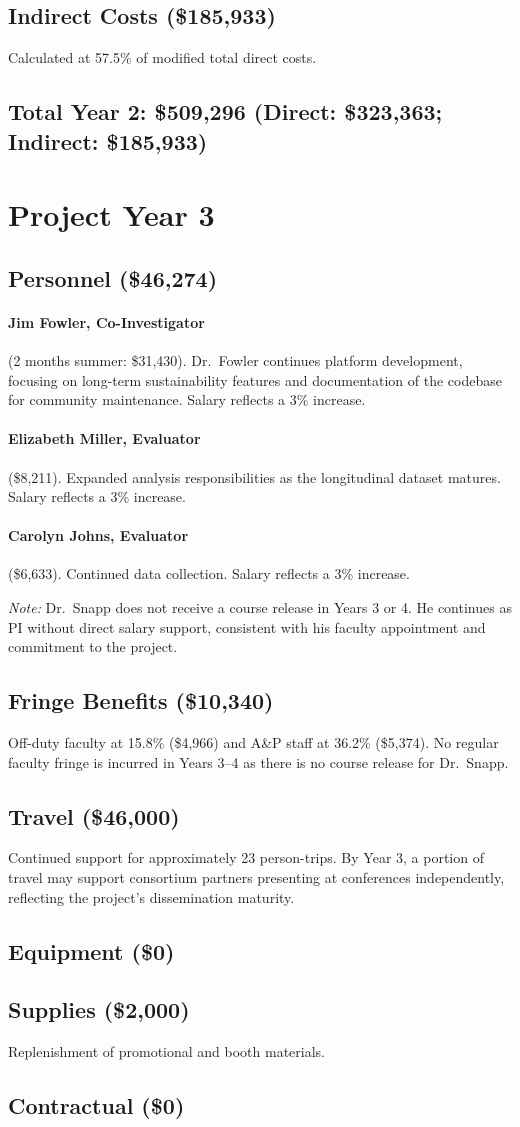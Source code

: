 \documentclass[12pt,letterpaper]{article}
\newcommand{\budgetyear}[1]{\section{Project Year #1}}
\newcommand{\budgetcat}[1]{\subsection*{#1}}
\begin{document}
\budgetcat{Indirect Costs (\$185,933)}

Calculated at 57.5\% of modified total direct costs.
\budgetcat{Total Year 2: \$509,296 (Direct: \$323,363; Indirect: \$185,933)}

\budgetyear{3}

\budgetcat{Personnel (\$46,274)}

\paragraph{Jim Fowler, Co-Investigator} (2 months summer: \$31,430). Dr.\ Fowler continues platform development, focusing on long-term sustainability features and documentation of the codebase for community maintenance. Salary reflects a 3\% increase.

\paragraph{Elizabeth Miller, Evaluator} (\$8,211). Expanded analysis responsibilities as the longitudinal dataset matures. Salary reflects a 3\% increase.

\paragraph{Carolyn Johns, Evaluator} (\$6,633). Continued data collection. Salary reflects a 3\% increase.

\textit{Note:} Dr.\ Snapp does not receive a course release in Years 3 or 4. He continues as PI without direct salary support, consistent with his faculty appointment and commitment to the project.

\budgetcat{Fringe Benefits (\$10,340)}

Off-duty faculty at 15.8\% (\$4,966) and A\&P staff at 36.2\% (\$5,374). No regular faculty fringe is incurred in Years 3--4 as there is no course release for Dr.\ Snapp.

\budgetcat{Travel (\$46,000)}

Continued support for approximately 23 person-trips. By Year 3, a portion of travel may support consortium partners presenting at conferences independently, reflecting the project's dissemination maturity.

\budgetcat{Equipment (\$0)}

\budgetcat{Supplies (\$2,000)}

Replenishment of promotional and booth materials.

\budgetcat{Contractual (\$0)}
\end{document}
